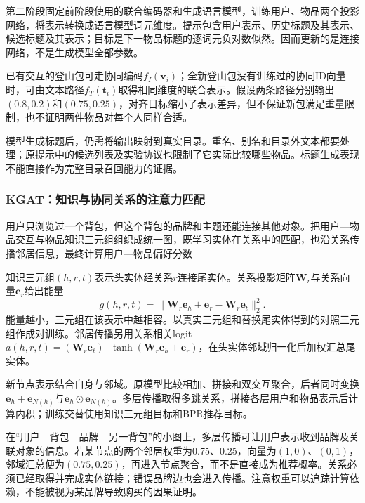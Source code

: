 第二阶段固定前阶段使用的联合编码器和生成语言模型，训练用户、物品两个投影网络，将表示转换成语言模型词元维度。提示包含用户表示、历史标题及其表示、候选标题及其表示；目标是下一物品标题的逐词元负对数似然。因而更新的是连接网络，不是生成模型全部参数。

已有交互的登山包可走协同编码$f_I(\bm{v}_i)$；全新登山包没有训练过的协同ID向量时，可由文本路径$f_T(\bm{t}_i)$取得相同维度的联合表示。假设两条路径分别输出$(0.8,0.2)$和$(0.75,0.25)$，对齐目标缩小了表示差异，但不保证新包满足重量限制，也不证明两件物品对每个人同样合适。

模型生成标题后，仍需将输出映射到真实目录。重名、别名和目录外文本都要处理；原提示中的候选列表及实验协议也限制了它实际比较哪些物品。标题生成表现不能直接作为完整目录召回能力的证据。

\subsubsection{KGAT：知识与协同关系的注意力匹配}
\label{sec:rs-kgat}

用户只浏览过一个背包，但这个背包的品牌和主题还能连接其他对象。把用户—物品交互与物品知识三元组组织成统一图，既学习实体在关系中的匹配，也沿关系传播邻居信息，最终计算用户—物品偏好分数

知识三元组$(h,r,t)$表示头实体经关系$r$连接尾实体。关系投影矩阵$\bm{W}_r$与关系向量$\bm{e}_r$给出能量
\begin{equation}
  g(h,r,t)=\lVert\bm{W}_r\bm{e}_h+\bm{e}_r
                         -\bm{W}_r\bm{e}_t\rVert_2^2.
  \label{eq:rs-kgat-energy}
\end{equation}
能量越小，三元组在该表示中越相容。以真实三元组和替换尾实体得到的对照三元组作成对训练。邻居传播另用关系相关logit
$a(h,r,t)=(\bm{W}_r\bm{e}_t)^\top
\tanh(\bm{W}_r\bm{e}_h+\bm{e}_r)$，在头实体邻域归一化后加权汇总尾实体。

新节点表示结合自身与邻域。原模型比较相加、拼接和双交互聚合，后者同时变换$\bm{e}_h+\bm{e}_{N(h)}$与$\bm{e}_h\odot\bm{e}_{N(h)}$。多层传播取得多跳关系，拼接各层用户和物品表示后计算内积；训练交替使用知识三元组目标和BPR推荐目标。

在“用户—背包—品牌—另一背包”的小图上，多层传播可让用户表示收到品牌及关联对象的信息。若某节点的两个邻居权重为0.75、0.25，向量为$(1,0)$、$(0,1)$，邻域汇总便为$(0.75,0.25)$，再进入节点聚合，而不是直接成为推荐概率。关系必须已经取得并完成实体链接；错误品牌边也会进入传播。注意权重可以追踪计算依赖，不能被视为某品牌导致购买的因果证明。

